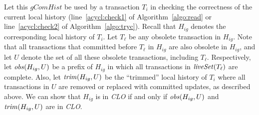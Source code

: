 \documentclass{llncs}
\newcommand{\id}[1]{\mbox{\textit{#1}}}\newcommand{\res}[1]{\mbox{\textbf{#1}}}
\newcommand{\clo} {\textit{CLO}}
\newcommand{\gchist} {\textit{gComHist}}
\newcommand{\liveset} {liveSet}
\begin{document}
Let this $\gchist$ be used by a transaction $T_i$ in checking the
correctness of the current local history (line~\ref{acycl:check1} of
Algorithm~\ref{algo:read} or line~\ref{acycl:check2} of
Algorithm~\ref{algo:tryc}). 
Recall that $H_{ig}$ denotes the corresponding local history of $T_i$.
Let $T_{\ell}$ be any obsolete transaction in $H_{ig}$.
Note that all transactions that committed before $T_{\ell}$ in
$H_{ig}$ are also obsolete in $H_{ig}$, and let $U$ denote the
set of all these obsolete transactions, including $T_{\ell}$.
Respectively, let $\id{obs}(H_{ig},U)$ be a prefix of $H_{ig}$
in which all transactions in $\id{\liveset}(T_{\ell})$ are  complete.
Also, let $\id{trim}(H_{ig},U)$ be the ``trimmed'' local history of $T_i$
where all transactions in $U$ are removed or replaced with committed
updates, as described above.
We can show that $H_{ig}$ is in {\clo} if and only if $\id{obs}(H_{ig},U)$ and $\id{trim}(H_{ig},U)$ are in {\clo}. 
\end{document}
